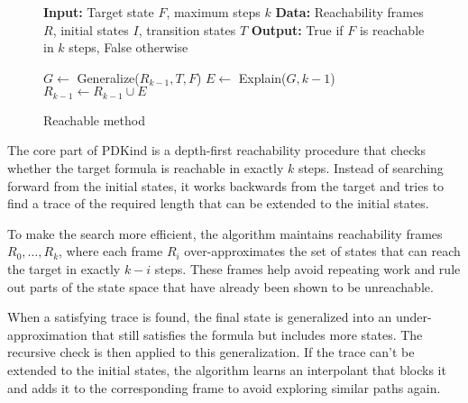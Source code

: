 \renewcommand{\figurename}{Algorithm}
\begin{figure}[H]
    \begin{mdframed}
        \begin{algorithmic}[1]
            \State \textbf{Input:} Target state $F$, maximum steps $k$
            \State \textbf{Data:} Reachability frames $R$, initial states $I$, transition states $T$
            \State \textbf{Output:} True if $F$ is reachable in $k$ steps, False otherwise

                \State {}
            \EndIf

                    \State $G \gets$ Generalize($R_{k-1}, T, F$)
                        \State {}
                    \Else
                        \State $E \gets$ Explain($G, k-1$)
                        \State $R_{k-1} \gets R_{k-1} \cup E$
                    \EndIf
                \Else
                    \State {}
                \EndIf
            \EndWhile

        \end{algorithmic}
    \end{mdframed}
    \caption{Reachable method}
    \label{alg:1}
\end{figure}

\vspace{\baselineskip}
\noindent The core part of PDKind is a depth-first reachability procedure that checks whether the target formula is reachable in exactly \( k \) steps. Instead of searching forward from the initial states, it works backwards from the target and tries to find a trace of the required length that can be extended to the initial states.

To make the search more efficient, the algorithm maintains reachability frames \( R_0, \dots, R_k \), where each frame \( R_i \) over-approximates the set of states that can reach the target in exactly \( k - i \) steps. These frames help avoid repeating work and rule out parts of the state space that have already been shown to be unreachable.

When a satisfying trace is found, the final state is generalized into an under-approximation that still satisfies the formula but includes more states. The recursive check is then applied to this generalization. If the trace can’t be extended to the initial states, the algorithm learns an interpolant that blocks it and adds it to the corresponding frame to avoid exploring similar paths again.

